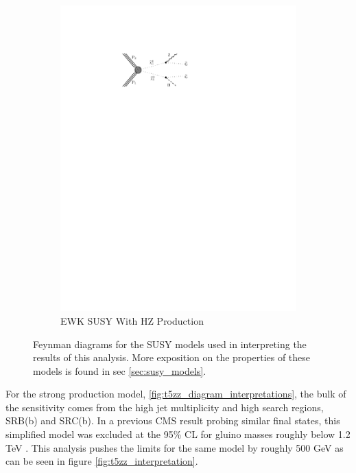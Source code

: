 \begin{figure}[!h]
\begin{subfigure}[b]{0.49\textwidth}
        \includegraphics[width=\textwidth]{figures/diagrams/TChiHZ.pdf}
        \caption{EWK SUSY With HZ Production}
        \label{fig:tchihz_diagram_interpretations}
      \end{subfigure}
      \caption{ \label{fig:SUSY_diagrams_interpretation_sec}
        Feynman diagrams for the SUSY models used in interpreting the results of this analysis. More exposition on the properties of these models is found in sec \ref{sec:susy_models}.}
    \end{figure}

    For the strong production model, \ref{fig:t5zz_diagram_interpretations}, the bulk of the sensitivity comes from the high jet multiplicity and high \MET search regions, SRB(b) and SRC(b). In a previous CMS result probing similar final states, this simplified model was excluded at the 95\% CL for gluino masses roughly below 1.2 TeV \cite{paper_2015}. This analysis pushes the limits for the same model by roughly 500 GeV as can be seen in figure \ref{fig:t5zz_interpretation}.

